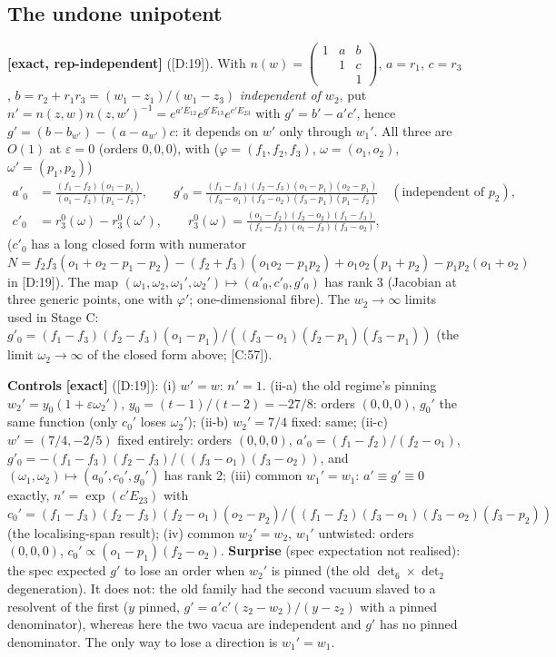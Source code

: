 \documentclass[10pt]{article}
\newcommand{\cl}[2]{\textsf{[#1:#2]}}
\newcommand{\tg}[1]{\textbf{[#1]}}
\begin{document}
\subsection{The undone unipotent}\label{sec:Dn}

\tg{exact, rep-independent} (\cl{D}{19}). With $n(w)=\left(\begin{smallmatrix}1&a&b\\&1&c\\&&1\end{smallmatrix}\right)$, $a=r_1$, $c=r_3$, $b=r_2+r_1r_3=(w_1-z_1)/(w_1-z_3)$ \emph{independent of $w_2$}, put $n'=n(z,w)n(z,w')^{-1}=e^{a'E_{12}}e^{g'E_{13}}e^{c'E_{23}}$ with $g'=b'-a'c'$, hence $g'=(b-b_{w'})-(a-a_{w'})c$: it depends on $w'$ only through $w_1'$. All three are $O(1)$ at $\varepsilon=0$ (orders $0,0,0$), with ($\varphi=(f_1,f_2,f_3)$, $\omega=(o_1,o_2)$, $\omega'=(p_1,p_2)$)
\begin{align*}
a'_0&=\frac{(f_1-f_2)(o_1-p_1)}{(o_1-f_2)(p_1-f_2)},\qquad
g'_0=\frac{(f_1-f_3)(f_2-f_3)(o_1-p_1)(o_2-p_1)}{(f_3-o_1)(f_3-o_2)(f_3-p_1)(p_1-f_2)}\quad(\text{independent of }p_2),\\
c'_0&=r_3^0(\omega)-r_3^0(\omega'),\qquad r_3^0(\omega)=\frac{(o_1-f_2)(f_2-o_2)(f_1-f_3)}{(f_1-f_2)(o_1-f_3)(f_3-o_2)},
\end{align*}
($c'_0$ has a long closed form with numerator $N=f_2f_3(o_1+o_2-p_1-p_2)-(f_2+f_3)(o_1o_2-p_1p_2)+o_1o_2(p_1+p_2)-p_1p_2(o_1+o_2)$ in \cl{D}{19}). The map $(\omega_1,\omega_2,\omega_1',\omega_2')\mapsto(a'_0,c'_0,g'_0)$ has rank 3 (Jacobian at three generic points, one with $\varphi'$; one-dimensional fibre). The $w_2\to\infty$ limits used in Stage C: $g'_0=(f_1-f_3)(f_2-f_3)(o_1-p_1)/((f_3-o_1)(f_2-p_1)(f_3-p_1))$ (the limit $\omega_2\to\infty$ of the closed form above; \cl{C}{57}).

\textbf{Controls} \tg{exact} (\cl{D}{19}): (i) $w'=w$: $n'=1$. (ii-a) the old regime's pinning $w_2'=y_0(1+\varepsilon\omega_2')$, $y_0=(t-1)/(t-2)=-27/8$: orders $(0,0,0)$, $g_0'$ the same function (only $c_0'$ loses $\omega_2'$); (ii-b) $w_2'=7/4$ fixed: same; (ii-c) $w'=(7/4,-2/5)$ fixed entirely: orders $(0,0,0)$, $a'_0=(f_1-f_2)/(f_2-o_1)$, $g'_0=-(f_1-f_3)(f_2-f_3)/((f_3-o_1)(f_3-o_2))$, and $(\omega_1,\omega_2)\mapsto(a_0',c_0',g_0')$ has rank 2; (iii) common $w_1'=w_1$: $a'\equiv g'\equiv0$ exactly, $n'=\exp(c'E_{23})$ with $c_0'=(f_1-f_3)(f_2-f_3)(f_2-o_1)(o_2-p_2)/((f_1-f_2)(f_3-o_1)(f_3-o_2)(f_3-p_2))$ (the localising-span result); (iv) common $w_2'=w_2$, $w_1'$ untwisted: orders $(0,0,0)$, $c_0'\propto(o_1-p_1)(f_2-o_2)$. \textbf{Surprise} (spec expectation not realised): the spec expected $g'$ to lose an order when $w_2'$ is pinned (the old $\det_6\times\det_2$ degeneration). It does not: the old family had the second vacuum slaved to a resolvent of the first ($y$ pinned, $g'=a'c'(z_2-w_2)/(y-z_2)$ with a pinned denominator), whereas here the two vacua are independent and $g'$ has no pinned denominator. The only way to lose a direction is $w_1'=w_1$.
\end{document}
